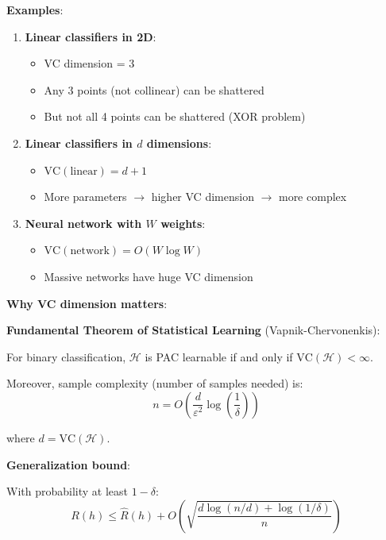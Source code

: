 \textbf{Examples}:

\begin{enumerate}
    \item \textbf{Linear classifiers in 2D}:
    \begin{itemize}
        \item VC dimension = 3
        \item Any 3 points (not collinear) can be shattered
        \item But not all 4 points can be shattered (XOR problem)
    \end{itemize}

    \item \textbf{Linear classifiers in $d$ dimensions}:
    \begin{itemize}
        \item $\text{VC}(\text{linear}) = d + 1$
        \item More parameters $\rightarrow$ higher VC dimension $\rightarrow$ more complex
    \end{itemize}

    \item \textbf{Neural network with $W$ weights}:
    \begin{itemize}
        \item $\text{VC}(\text{network}) = O(W \log W)$
        \item Massive networks have huge VC dimension
    \end{itemize}
\end{enumerate}

\textbf{Why VC dimension matters}:

\textbf{Fundamental Theorem of Statistical Learning} (Vapnik-Chervonenkis):

For binary classification, $\mathcal{H}$ is PAC learnable if and only if $\text{VC}(\mathcal{H}) < \infty$.

Moreover, sample complexity (number of samples needed) is:
\begin{equation}
n = O\left(\frac{d}{\varepsilon^2} \log\left(\frac{1}{\delta}\right)\right)
\end{equation}

where $d = \text{VC}(\mathcal{H})$.

\textbf{Generalization bound}:

With probability at least $1-\delta$:
\begin{equation}
R(h) \leq \hat{R}(h) + O\left(\sqrt{\frac{d \log(n/d) + \log(1/\delta)}{n}}\right)
\end{equation}

